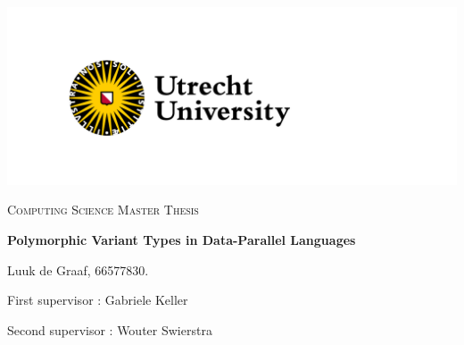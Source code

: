 \documentclass{article}
\date{\today}
\begin{document}
\begin{titlepage}

    \centering
    
    \hspace{2cm}\includegraphics[scale=1.0]{uulogo.png}

	\vspace{1cm}
	{\Large \textsc{Computing Science Master Thesis}\par}
	\vspace{1.0cm}
	{\huge\bfseries Polymorphic Variant Types in Data-Parallel Languages \par}
	\vspace{1.5cm}

    \begin{abstract}
        Data-parallelism uses the uniformity between multiple data elements to accelerate the process of operating on large collections of data.
        Variant types constrain the ability to operate uniformly, which therefore limit data-parallelism opportunities in the general case.
        In the situations where non-uniformity is inherit to the algorithm low-level optimizations are used to mitigate the heterogeneity.
        In this paper a higher abstraction level variant type is explored which can capture the required low-level control to be able to represent these optimizations in data-parallel languages.
        A polymorphic variant type is used to represent variability on the type-level, which is used by data structures to adapt to the identity of the variant type.
        Type-level programming is used to derive memory efficient representation for user-defined datatypes.
        (De)construction of variant types is automated through datatype-generic programming, which means custom memory representations can be provided seamlessly.
        It results in a fully modular variant type that can exercise low-level control while preserving the type identity of variant.
        An implementation is provided in the data-parallel language {\it Accelerate}, which demonstrates the viability of variant types in a data-parallel context.
    \end{abstract}

	\vfill

    {\Large Luuk de Graaf, 66577830. \par}

    \vspace{0.5cm}
    {\normalsize First supervisor   : Gabriele Keller \par}
    {\normalsize Second supervisor  : Wouter Swierstra \par}

\end{titlepage}
\end{document}
